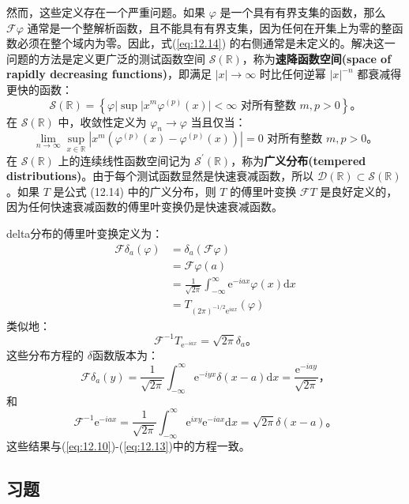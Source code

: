 然而，这些定义存在一个严重问题。如果 $\varphi$
是一个具有有界支集的函数，那么 $\mathcal{F} \varphi$
通常是一个整解析函数，且不能具有有界支集，因为任何在开集上为零的整函数必须在整个域内为零。因此，式(\ref{eq:12.14}) 的右侧通常是未定义的。解决这一问题的方法是定义更广泛的测试函数空间
$\mathcal{S}(\mathbb{R})$，称为\textbf{速降函数空间(space of rapidly decreasing functions)}，即满足
$|x| \to \infty$ 时比任何逆幂 $|x|^{-n}$ 都衰减得更快的函数：
 $$
\mathcal{S}(\mathbb{R}) = \left\{\varphi | \sup |x^m \varphi^{(p)}(x)| < \infty \text{ 对所有整数 } m, p > 0 \right\}。
$$
在 $\mathcal{S}(\mathbb{R})$ 中，收敛性定义为
$\varphi_n \to \varphi$ 当且仅当：
 $$
\lim_{n \to \infty} \sup_{x \in \mathbb{R}} \left|x^m \left(\varphi^{(p)}(x) - \varphi^{(p)}(x)\right)\right| = 0 \text{ 对所有整数 } m, p > 0。
$$
在 $\mathcal{S}(\mathbb{R})$ 上的连续线性函数空间记为
$\mathcal{S}^\prime(\mathbb{R})$，称为\textbf{广义分布(tempered distributions)}。由于每个测试函数显然是快速衰减函数，所以
$\mathcal{D}(\mathbb{R}) \subset \mathcal{S}(\mathbb{R})$。如果 $T$
是公式 (12.14) 中的广义分布，则 $T$ 的傅里叶变换 $\mathcal{F} T$
是良好定义的，因为任何快速衰减函数的傅里叶变换仍是快速衰减函数。
\begin{eg}\label{eg:12.8}
  delta分布的傅里叶变换定义为：
$$
\begin{aligned}
\mathcal{F} \delta_{a}(\varphi) & = \delta_{a}(\mathcal{F} \varphi) \\
& = \mathcal{F} \varphi(a) \\
& = \frac{1}{\sqrt{2 \pi}} \int_{-\infty}^\infty \mathrm{e}^{-i a x} \varphi(x) \mathrm{d} x \\
& = T_{(2 \pi)^{-1 / 2} \mathrm{e}^{i a x}}(\varphi)
\end{aligned}
$$ 
类似地： 
$$
\mathcal{F}^{-1} T_{\mathrm{e}^{-i a x}} = \sqrt{2 \pi} \delta_{a}。
$$ 
这些分布方程的 $\delta$函数版本为：
$$
\mathcal{F} \delta_{a}(y) = \frac{1}{\sqrt{2 \pi}} \int_{-\infty}^\infty \mathrm{e}^{-i y x} \delta(x-a) \mathrm{d} x = \frac{\mathrm{e}^{-i a y}}{\sqrt{2 \pi}}，
$$ 
和 
$$
\mathcal{F}^{-1} \mathrm{e}^{-i a x} = \frac{1}{\sqrt{2 \pi}} \int_{-\infty}^\infty \mathrm{e}^{i x y} \mathrm{e}^{-i a x} \mathrm{d} x = \sqrt{2 \pi} \delta(x-a)。
$$ 
这些结果与(\ref{eq:12.10})-(\ref{eq:12.13})中的方程一致。

\end{eg}
\subsection*{习题}

